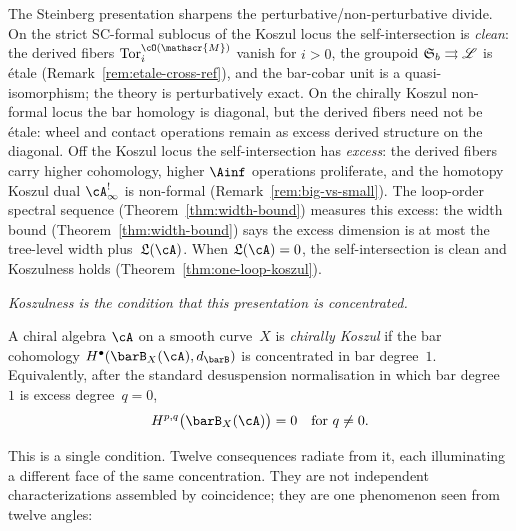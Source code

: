 \begin{remark}
\label{rem:steinberg-perturbative}
The Steinberg presentation sharpens the perturbative/non-perturbative
divide. On the strict SC-formal sublocus of the Koszul locus the
self-intersection is \emph{clean}: the derived fibers
$\operatorname{Tor}^{\cO(\mathscr{M})}_i$ vanish for $i > 0$, the
groupoid $\mathfrak{S}_b \rightrightarrows \mathscr{L}$ is \'etale
(Remark~\ref{rem:etale-cross-ref}), and the bar-cobar unit is a
quasi-isomorphism; the theory is perturbatively exact. On the
chirally Koszul non-formal locus the bar homology is diagonal, but the
derived fibers need not be \'etale: wheel and contact operations remain
as excess derived structure on the diagonal.
Off the Koszul locus the self-intersection has \emph{excess}: the
derived fibers carry higher cohomology, higher $\Ainf$ operations
proliferate, and the homotopy Koszul dual $\cA^!_\infty$ is non-formal
(Remark~\ref{rem:big-vs-small}).
The loop-order spectral sequence
(Theorem~\ref{thm:width-bound}) measures this excess:
the width bound (Theorem~\ref{thm:width-bound}) says the
excess dimension is at most the tree-level width
plus~$\mathfrak{L}(\cA)$. When $\mathfrak{L}(\cA) = 0$, the
self-intersection is clean and Koszulness holds
(Theorem~\ref{thm:one-loop-koszul}).
\end{remark}

\emph{Koszulness is the condition that this presentation is
concentrated.}

\begin{definition}
\label{def:chiral-koszul-geometric}
A chiral algebra $\cA$ on a smooth curve~$X$ is
\emph{chirally Koszul} if the bar cohomology
$H^\bullet(\barB_X(\cA), d_{\barB})$ is concentrated in bar
degree~$1$. Equivalently, after the standard desuspension
normalisation in which bar degree~$1$ is excess degree~$q=0$,
\begin{equation}\label{eq:koszul-concentration}
H^{p,q}\bigl(\barB_X(\cA)\bigr) = 0 \quad
\text{for } q \neq 0.
\end{equation}
\end{definition}

This is a single condition. Twelve consequences radiate from it, each
illuminating a different face of the same concentration. They are not
independent characterizations assembled by coincidence; they are one
phenomenon seen from twelve angles:

